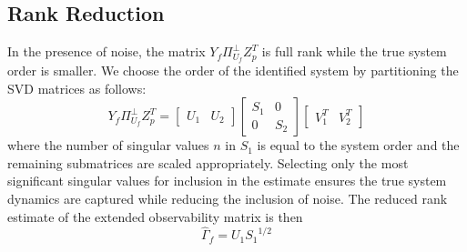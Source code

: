 \subsection{Rank Reduction}\label{sec:3_rank_reduction}
In the presence of noise, the matrix $Y_f\Pi_{U_f}^\perp Z_p^T$ is full rank while the true system order is smaller. We choose the order of the identified system by partitioning the SVD matrices as follows:
\begin{equation*}
Y_f\Pi_{U_f}^\perp Z_p^T = 
\begin{bmatrix}U_1 & U_2\end{bmatrix}
\begin{bmatrix}S_1 & 0\\ 0 & S_2\end{bmatrix}
\begin{bmatrix}V_1^T & V_2^T\end{bmatrix}
\end{equation*}
where the number of singular values $n$ in $S_1$ is equal to the system order and the remaining submatrices are scaled appropriately. Selecting only the most significant singular values for inclusion in the estimate ensures the true system dynamics are captured while reducing the inclusion of noise. The reduced rank estimate of the extended observability matrix is then
\begin{equation}
\hat{\Gamma}_f = U_1 {S_1}^{1/2}
\end{equation}


